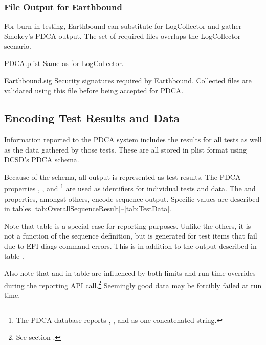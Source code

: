 \subsubsection{File Output for Earthbound}
\label{sec:EarthboundFiles}

For burn-in testing, Earthbound can substitute for LogCollector and gather
Smokey's PDCA output.  The set of required files overlaps the LogCollector
scenario.

\begin{Definition}

	\item[PDCA.plist] Same as for LogCollector.

	\item[Earthbound.sig] Security signatures required by Earthbound.
	Collected files are validated using this file before being accepted for
	PDCA.

\end{Definition}

\subsection{Encoding Test Results and Data}
\label{sec:TestResults}

Information reported to the PDCA system includes the results for all tests as
well as the data gathered by those tests.  These are all stored in plist format
using DCSD's PDCA schema.

Because of the schema, all output is represented as test results.  The PDCA
properties , , and
\footnote{The PDCA database reports ,
, and  as one concatenated string.} are
used as identifiers for individual tests and data.  The  and
 properties, amongst others, encode sequence output.
Specific values are described in tables
\ref{tab:OverallSequenceResult}--\ref{tab:TestData}.

Note that table  is a special case for
reporting purposes.  Unlike the others, it is not a function of the sequence
definition, but is generated for test items that fail due to EFI diags command
errors.  This is in addition to the output described in table
.

Also note that  and  in table
 are influenced by both limits and run-time overrides
during the reporting API call.\footnote{See section
.}  Seemingly good data may be forcibly failed at run
time.

